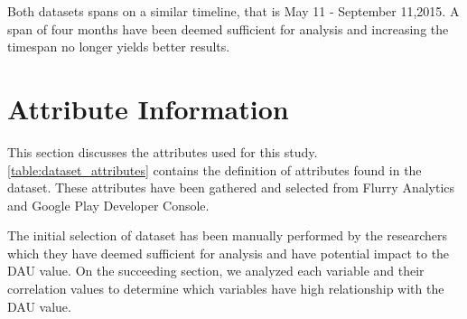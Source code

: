 Both datasets spans on a similar timeline, that is May 11 - September 11,2015. A span of four months have been deemed sufficient for analysis and increasing the timespan no longer yields better results.

\section{Attribute Information}
This section discusses the attributes used for this study.  \ref{table:dataset_attributes} contains the definition of attributes found in the dataset. These attributes have been gathered and selected from Flurry Analytics and Google Play Developer Console. 

The initial selection of dataset has been manually performed by the researchers which they have deemed sufficient for analysis and have potential impact to the DAU value. On the succeeding section, we analyzed each variable and their correlation values to determine which variables have high relationship with the DAU value.

